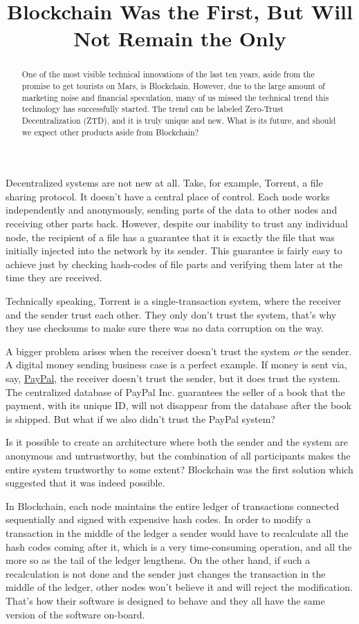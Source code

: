 \documentclass{main}
\title{Blockchain Was the First, But Will Not Remain the Only}
\begin{document}
\begin{abstract}
One of the most visible technical innovations of the last ten years,
aside from the promise to get tourists on Mars, is Blockchain. However,
due to the large amount of marketing noise and financial speculation, many
of us missed the technical trend this technology has successfully started.
The trend can be labeled Zero-Trust Decentralization (ZTD), and it
is truly unique and new. What is its future, and should we
expect other products aside from Blockchain?
\end{abstract}

Decentralized systems are not new at all. Take, for example, Torrent, a file sharing
protocol. It doesn't have a central place of control. Each node
works independently and anonymously, sending parts of the data to other nodes
and receiving other parts back.  However, despite our inability to trust
any individual node, the recipient of a file has a guarantee that it is
exactly the file that was initially injected into the network by its sender.
This guarantee is fairly easy to achieve just by checking hash-codes
of file parts and verifying them later at the time they are received.

Technically speaking, Torrent is a single-transaction system, where the
receiver and the sender trust each other. They only don't trust the system,
that's why they use checksums to make sure there was no data corruption
on the way.

A bigger problem arises when the receiver doesn't trust the system \emph{or}
the sender. A digital money sending business case is a perfect example. If money
is sent via, say, \href{https://www.paypal.com}{PayPal}, the receiver doesn't trust the sender, but it
does trust the system. The centralized database of PayPal Inc. guarantees
the seller of a book that the payment, with its unique ID, will
not disappear from the database after the book is shipped. But what if we also didn't trust
the PayPal system?

Is it possible to create an architecture where both the sender and the system
are anonymous and untrustworthy, but the combination of all participants
makes the entire system trustworthy to some extent? Blockchain was the first
solution which suggested that it was indeed possible.

In Blockchain, each node maintains the entire ledger of transactions
connected sequentially and signed with expensive hash codes. In order to modify
a transaction in the middle of the ledger a sender would have to recalculate
all the hash codes coming after it, which is a very time-consuming operation,
and all the more so as the tail of the ledger lengthens. On the other hand,
if such a recalculation is not done and the sender just changes the
transaction in the middle of the ledger, other nodes won't believe it and
will reject the modification. That's how their software is designed to behave
and they all have the same version of the software on-board.
\end{document}
